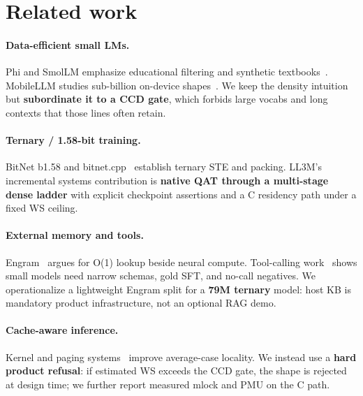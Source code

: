 \documentclass[11pt,a4paper]{article}
\begin{document}
\section{Related work}
\label{sec:related}

\paragraph{Data-efficient small LMs.}
Phi and SmolLM emphasize educational filtering and synthetic textbooks~\citep{gunasekar2023textbooks,li2023textbooks2,allal2025smollm,penedo2024fineweb,eldan2023tinystories}.
MobileLLM studies sub-billion on-device shapes~\citep{liu2024mobilellm}.
We keep the density intuition but \textbf{subordinate it to a CCD gate}, which forbids large vocabs and long contexts that those lines often retain.

\paragraph{Ternary / 1.58-bit training.}
BitNet b1.58 and bitnet.cpp~\citep{ma2024bitnet,wang2023bitnet,bitnetcpp2025,bitnetcpp} establish ternary STE and packing.
LL3M's incremental systems contribution is \textbf{native QAT through a multi-stage dense ladder} with explicit checkpoint assertions and a C residency path under a fixed WS ceiling.

\paragraph{External memory and tools.}
Engram~\citep{deepseek2026engram} argues for O(1) lookup beside neural compute.
Tool-calling work~\citep{patil2023gorilla,when2call,vanroy2025slmfc,chen2024octopus,lacy2026} shows small models need narrow schemas, gold SFT, and no-call negatives.
We operationalize a lightweight Engram split for a \textbf{79M ternary} model: host KB is mandatory product infrastructure, not an optional RAG demo.

\paragraph{Cache-aware inference.}
Kernel and paging systems~\citep{llamacpp,mlcllm,song2023powerinfer} improve average-case locality.
We instead use a \textbf{hard product refusal}: if estimated WS exceeds the CCD gate, the shape is rejected at design time; we further report measured mlock and PMU on the C path.
\end{document}
